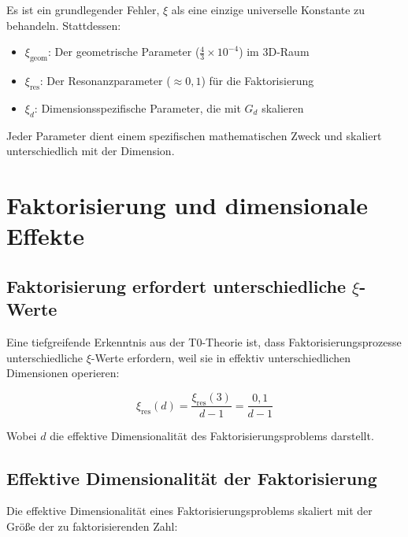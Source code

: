 \documentclass[12pt,a4paper]{article}
\newcommand{\xipar}{\ensuremath{\xi}}
\newcommand{\mytimes}{\ensuremath{\times}}
\begin{document}
	\begin{tcolorbox}[colback=red!5!white,colframe=red!75!black,title=Kritisches Verständnis: Multiple $\xi$-Parameter]
		Es ist ein grundlegender Fehler, $\xipar$ als eine einzige universelle Konstante zu behandeln. Stattdessen:
		
		\begin{itemize}
			\item $\xipar_{\text{geom}}$: Der geometrische Parameter ($\frac{4}{3} \mytimes 10^{-4}$) im 3D-Raum
			\item $\xipar_{\text{res}}$: Der Resonanzparameter ($\approx 0,1$) für die Faktorisierung
			\item $\xipar_d$: Dimensionsspezifische Parameter, die mit $G_d$ skalieren
		\end{itemize}
		
		Jeder Parameter dient einem spezifischen mathematischen Zweck und skaliert unterschiedlich mit der Dimension.
	\end{tcolorbox}
	
	\section{Faktorisierung und dimensionale Effekte}
	\label{sec:factorization_dimensional}
	
	\subsection{Faktorisierung erfordert unterschiedliche $\xi$-Werte}
	\label{subsec:factorization_xi}
	
	Eine tiefgreifende Erkenntnis aus der T0-Theorie ist, dass Faktorisierungsprozesse unterschiedliche $\xipar$-Werte erfordern, weil sie in effektiv unterschiedlichen Dimensionen operieren:
	
	\begin{equation}
		\xipar_{\text{res}}(d) = \frac{\xipar_{\text{res}}(3)}{d-1} = \frac{0,1}{d-1}
	\end{equation}
	
	Wobei $d$ die effektive Dimensionalität des Faktorisierungsproblems darstellt.
	
	\subsection{Effektive Dimensionalität der Faktorisierung}
	\label{subsec:effective_dimensionality}
	
	Die effektive Dimensionalität eines Faktorisierungsproblems skaliert mit der Größe der zu faktorisierenden Zahl:
	
\end{document}
